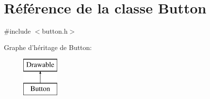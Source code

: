 \hypertarget{class_button}{\section{Référence de la classe Button}
\label{class_button}
}


{\ttfamily \#include $<$button.\+h$>$}

Graphe d'héritage de Button\+:\begin{figure}[H]
\begin{center}
\leavevmode
\includegraphics[height=2.000000cm]{class_button}
\end{center}
\end{figure}
